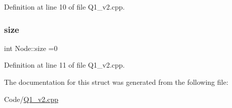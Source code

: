 Definition at line 10 of file Q1\+\_\+v2.\+cpp.

\mbox{\label{struct_node_acc103d220defd2fdb5aac8e3b03424c6}} 
\subsubsection{\texorpdfstring{size}{size}}
{\footnotesize\ttfamily int Node\+::size =0}



Definition at line 11 of file Q1\+\_\+v2.\+cpp.



The documentation for this struct was generated from the following file\+:\begin{DoxyCompactItemize}
\item 
Code/\hyperlink{_q1__v2_8cpp}{Q1\+\_\+v2.\+cpp}\end{DoxyCompactItemize}
